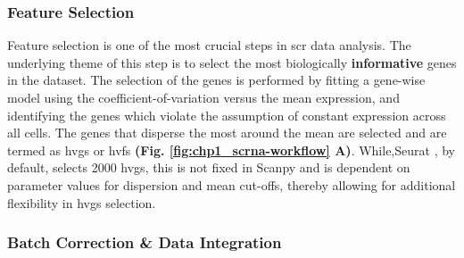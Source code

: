 \subsubsection{Feature Selection}
Feature selection is one of the most crucial steps in \gls{scr} data analysis. The underlying theme of this step is to select the most biologically \textbf{informative} genes in the dataset. The selection of the genes is performed by fitting a gene-wise model using the coefficient-of-variation versus the mean expression, and identifying the genes which violate the assumption of constant expression across all cells. The genes that disperse the most around the mean are selected and are termed as \glspl{hvg} or \glspl{hvf} \textbf{(Fig. \ref{fig:chp1_scrna-workflow} A)}. %
While,Seurat \textbf{\cite{butler_integrating_2018,stuart_comprehensive_2019,hao_integrated_2021}}, by default, selects 2000 \glspl{hvg}, this is not fixed in Scanpy \textbf{\cite{wolf_scanpy_2018}} and is dependent on parameter values for dispersion and mean cut-offs, thereby allowing for additional flexibility in \glspl{hvg} selection.

\subsubsection{Batch Correction \& Data Integration}

